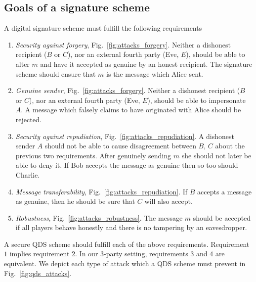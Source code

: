 \subsection{Goals of a signature scheme}\label{sec:qds_goals}

A digital signature scheme must fulfill the following requirements

\begin{mylist}
\begin{enumerate}
\item\emph{Security against forgery}, Fig.~\ref{fig:attacks_forgery}. Neither a dishonest recipient ($B$ or $C$), nor an external fourth party (Eve, $E$), should be able to alter $m$ and have it accepted as genuine by an honest recipient. The signature scheme should ensure that $m$ is the message which Alice sent.

\item\emph{Genuine sender}, Fig.~\ref{fig:attacks_forgery}. Neither a dishonest recipient ($B$ or $C$), nor an external fourth party (Eve, $E$), should be able to impersonate $A$. A message which falsely claims to have originated with Alice should be rejected.

\item\emph{Security against repudiation}, Fig.~\ref{fig:attacks_repudiation}. A dishonest sender $A$ should not be able to cause disagreement between $B$, $C$ about the previous two requirements. After genuinely sending $m$ she should not later be able to deny it. If Bob accepts the message as genuine then so too should Charlie. 

\item \emph{Message transferability}, Fig.~\ref{fig:attacks_repudiation}. If $B$ accepts a message as genuine, then he should be sure that $C$ will also accept.

\item \emph{Robustness}, Fig.~\ref{fig:attacks_robustness}. The message $m$ should be accepted if all players behave honestly and there is no tampering by an eavesdropper.
\end{enumerate}
\caption{\label{list:qds_requirements} A secure QDS scheme should fulfill each of the above requirements. Requirement $1$ implies requirement $2$. In our $3$-party setting, requirements $3$ and $4$ are equivalent. We depict each type of attack which a QDS scheme must prevent in Fig.~\ref{fig:qds_attacks}.}
\end{mylist}



